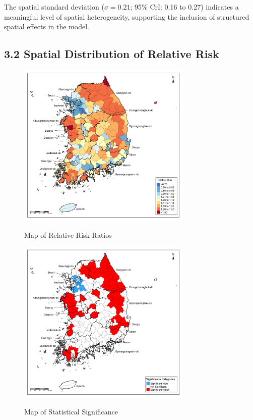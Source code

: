 \documentclass[11pt]{article}
\begin{document}
	The spatial standard deviation ($\sigma = 0.21$; 95\% CrI: 0.16 to 0.27) indicates a meaningful level of spatial heterogeneity, supporting the inclusion of structured spatial effects in the model.
	
	\newpage
	\subsection*{3.2 Spatial Distribution of Relative Risk}

	\vspace{-1em}

	\begin{figure}[H]
		\centering
		\caption{Map of Relative Risk Ratios}
		\includegraphics[width=0.74\textwidth]{assets/relative_risk/relative_risk_map_2022_annotated.png}
		\label{fig:relative_risk_map}
	\end{figure}

	\vspace{-2em}
	
	\begin{figure}[H]
		\centering
		\caption{Map of Statistical Significance}
		\includegraphics[width=0.74\textwidth]{assets/significance_categories/significance_categories_map_2022_annotated.png}
		\label{fig:significance_map}
	\end{figure}
\end{document}
